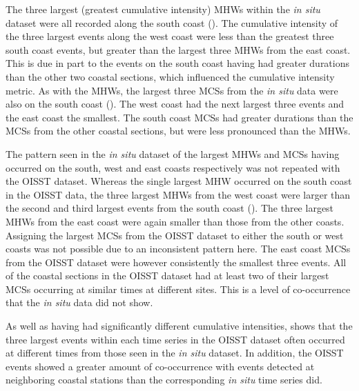 \documentclass[a4paper,10pt,review]{elsarticle}
\begin{document}
The three largest (greatest cumulative intensity) MHWs within the \emph{in situ} dataset were all recorded along the south coast (). The cumulative intensity of the three largest events along the west coast were less than the greatest three south coast events, but greater than the largest three MHWs from the east coast. This is due in part to the events on the south coast having had greater durations than the other two coastal sections, which influenced the cumulative intensity metric. As with the MHWs, the largest three MCSs from the \emph{in situ} data were also on the south coast (). The west coast had the next largest three events and the east coast the smallest. The south coast MCSs had greater durations than the MCSs from the other coastal sections, but were less pronounced than the MHWs.

The pattern seen in the \emph{in situ} dataset of the largest MHWs and MCSs having occurred on the south, west and east coasts respectively was not repeated with the OISST dataset. Whereas the single largest MHW occurred on the south coast in the OISST data, the three largest MHWs from the west coast were larger than the second and third largest events from the south coast (). The three largest MHWs from the east coast were again smaller than those from the other coasts. Assigning the largest MCSs from the OISST dataset to either the south or west coasts was not possible due to an inconsistent pattern here. The east coast MCSs from the OISST dataset were however consistently the smallest three events. All of the coastal sections in the OISST dataset had at least two of their largest MCSs occurring at similar times at different sites. This is a level of co-occurrence that the \emph{in situ} data did not show.

As well as having had significantly different cumulative intensities,  shows that the three largest events within each time series in the OISST dataset often occurred at different times from those seen in the \emph{in situ} dataset. In addition, the OISST events showed a greater amount of co-occurrence with events detected at neighboring coastal stations than the corresponding \emph{in situ} time series did.
\end{document}
